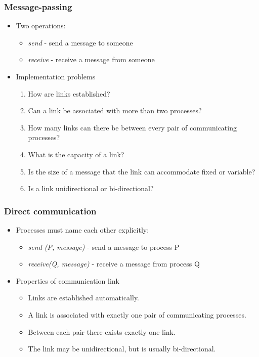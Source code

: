 \documentclass[CJKutf8,xcolor=pdftex,dvipsnames,table]{beamer}
\begin{document}
\begin{CJK*}{UTF8}{song}
  \begin{frame}
  \frametitle{Message-passing} \pause
  \begin{itemize}
  \item{Two operations:} \pause
    \begin{itemize}
    \item{\emph{send} \pause - send a message to someone} \pause
    \item{\emph{receive} \pause - receive a message from someone} \pause
    \end{itemize}
  \item{Implementation problems} \pause
    \begin{enumerate}
    \item{How are links established?} \pause
    \item{Can a link be associated with more than two processes?} \pause
    \item{How many links can there be between every pair of communicating processes?} \pause
    \item{What is the capacity of a link?} \pause
    \item{Is the size of a message that the link can accommodate fixed or variable?} \pause
    \item{Is a link unidirectional or bi-directional?}
    \end{enumerate}
  \end{itemize}
  \end{frame}

  \begin{frame}
  \frametitle{Direct communication} \pause
  \begin{itemize}
  \item{Processes must name each other explicitly:} \pause
    \begin{itemize}
    \item{\emph{send (P, message)} \pause - send a message to process P} \pause
    \item{\emph{receive(Q, message)} \pause - receive a message from process Q} \pause
    \end{itemize}
  \item{Properties of communication link} \pause
    \begin{itemize}
    \item{Links are established automatically.} \pause
    \item{A link is associated with exactly one pair of communicating processes.} \pause
    \item{Between each pair there exists exactly one link.} \pause
    \item{The link may be unidirectional, but is usually bi-directional.}
    \end{itemize}
  \end{itemize}
  \end{frame}


\end{CJK*}
\end{document}
